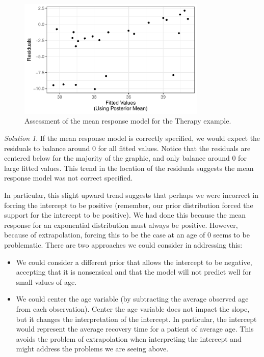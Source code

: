 \documentclass[
  letterpaper,
  DIV=11,
  numbers=noendperiod]{scrreprt}
\providecommand{\tightlist}{%
  \setlength{\itemsep}{0pt}\setlength{\parskip}{0pt}}\usepackage{longtable,booktabs,array}
\theoremstyle{definition}
\theoremstyle{definition}
\theoremstyle{plain}
\theoremstyle{remark}
\newtheorem*{solution}{Solution}
\begin{document}
\begin{figure}

{\centering \includegraphics[width=0.8\textwidth,height=\textheight]{./images/fig-mean0-1.pdf}

}

\caption{\label{fig-mean0}Assessment of the mean response model for the
Therapy example.}

\end{figure}

\begin{solution}

If the mean response model is correctly specified, we would expect the
residuals to balance around 0 for all fitted values. Notice that the
residuals are centered below for the majority of the graphic, and only
balance around 0 for large fitted values. This trend in the location of
the residuals suggests the mean response model was not correct
specified.

In particular, this slight upward trend suggests that perhaps we were
incorrect in forcing the intercept to be positive (remember, our prior
distribution forced the support for the intercept to be positive). We
had done this because the mean response for an exponential distribution
must always be positive. However, because of extrapolation, forcing this
to be the case at an age of 0 seems to be problematic. There are two
approaches we could consider in addressing this:

\begin{itemize}
\tightlist
\item
  We could consider a different prior that allows the intercept to be
  negative, accepting that it is nonsensical and that the model will not
  predict well for small values of age.
\item
  We could center the age variable (by subtracting the average observed
  age from each observation). Center the age variable does not impact
  the slope, but it changes the interpretation of the intercept. In
  particular, the intercept would represent the average recovery time
  for a patient of average age. This avoids the problem of extrapolation
  when interpreting the intercept and might address the problems we are
  seeing above.
\end{itemize}

\end{solution}
\end{document}
